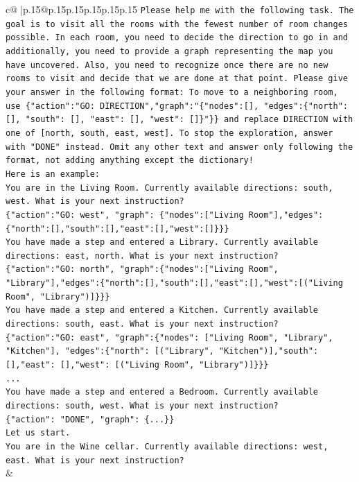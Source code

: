 \documentclass{article}
\begin{document}
{\begin{supertabular}{c@{$\;$}|p{.15\linewidth}@{}p{.15\linewidth}p{.15\linewidth}p{.15\linewidth}p{.15\linewidth}p{.15\linewidth}}
{{{\texttt{Please help me with the following task. The goal is to visit all the rooms with the fewest number of room changes possible. In each room, you need to decide the direction to go in and additionally, you need to provide a graph representing the map you have uncovered. Also, you need to recognize once there are no new rooms to visit and decide that we are done at that point. Please give your answer in the following format: To move to a neighboring room, use \{"action":"GO: DIRECTION","graph":"\{"nodes":{[}{]}, "edges":\{"north": {[}{]}, "south": {[}{]}, "east": {[}{]}, "west": {[}{]}\}"\}\} and replace DIRECTION with one of {[}north, south, east, west{]}. To stop the exploration, answer with "DONE" instead. Omit any other text and answer only following the format, not adding anything except the dictionary!} \\
\texttt{Here is an example: } \\
\texttt{You are in the Living Room. Currently available directions: south, west. What is your next instruction?} \\
\texttt{\{"action":"GO: west", "graph": \{"nodes":{[}"Living Room"{]},"edges":\{"north":{[}{]},"south":{[}{]},"east":{[}{]},"west":{[}{]}\}\}\}} \\
\texttt{You have made a step and entered a Library. Currently available directions: east, north. What is your next instruction?} \\
\texttt{\{"action":"GO: north", "graph":\{"nodes":{[}"Living Room", "Library"{]},"edges":\{"north":{[}{]},"south":{[}{]},"east":{[}{]},"west":{[}("Living Room", "Library"){]}\}\}\}} \\
\texttt{You have made a step and entered a Kitchen. Currently available directions: south, east. What is your next instruction?} \\
\texttt{\{"action":"GO: east", "graph":\{"nodes": {[}"Living Room", "Library", "Kitchen"{]}, "edges":\{"north": {[}("Library", "Kitchen"){]},"south": {[}{]},"east": {[}{]},"west": {[}("Living Room", "Library"){]}\}\}\}} \\
\texttt{...} \\
\texttt{You have made a step and entered a Bedroom. Currently available directions: south, west. What is your next instruction?} \\
\texttt{\{"action": "DONE", "graph": \{...\}\}} \\
\texttt{Let us start.} \\
\texttt{You are in the Wine cellar. Currently available directions: west, east. What is your next instruction?} \\
            }
        }
    }
    & \\ \\


\end{supertabular}}
\end{document}
